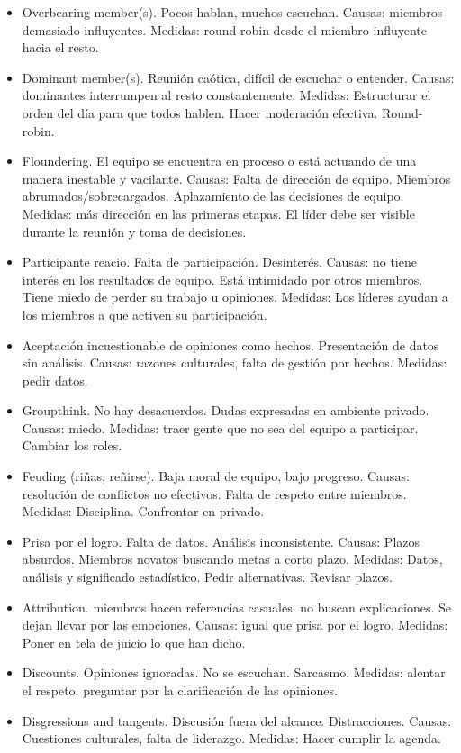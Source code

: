 \documentclass[]{article}
\begin{document}
\begin{itemize}
	\item Overbearing member(s). Pocos hablan, muchos escuchan. Causas: miembros demasiado influyentes. Medidas: round-robin desde el miembro influyente hacia el resto.
	\item Dominant member(s). Reunión caótica, difícil de escuchar o entender. Causas: dominantes interrumpen al resto constantemente. Medidas: Estructurar el orden del día para que todos hablen. Hacer moderación efectiva. Round-robin.
	\item Floundering. El equipo se encuentra en proceso o está actuando de una manera inestable y vacilante. Causas: Falta de dirección de equipo. Miembros abrumados/sobrecargados. Aplazamiento de las decisiones de equipo. Medidas: más dirección en las primeras etapas. El líder debe ser visible durante la reunión y toma de decisiones.
	\item Participante reacio. Falta de participación. Desinterés. Causas: no tiene interés en los resultados de equipo. Está intimidado por otros miembros. Tiene miedo de perder su trabajo u opiniones. Medidas: Los líderes ayudan a los miembros a que activen su participación.
	\item Aceptación incuestionable de opiniones como hechos. Presentación de datos sin análisis. Causas: razones culturales, falta de gestión por hechos. Medidas: pedir datos.
	\item Groupthink. No hay desacuerdos. Dudas expresadas en ambiente privado. Causas: miedo. Medidas: traer gente que no sea del equipo a participar. Cambiar los roles.
	\item Feuding (riñas, reñirse). Baja moral de equipo, bajo progreso. Causas: resolución de conflictos no efectivos. Falta de respeto entre miembros. Medidas: Disciplina. Confrontar en privado. 
	\item Prisa por el logro. Falta de datos. Análisis inconsistente. Causas: Plazos absurdos. Miembros novatos buscando metas a corto plazo. Medidas: Datos, análisis y significado estadístico. Pedir alternativas. Revisar plazos.
	\item Attribution. miembros hacen referencias casuales. no buscan explicaciones. Se dejan llevar por las emociones. Causas: igual que prisa por el logro. Medidas: Poner en tela de juicio lo que han dicho.
	\item Discounts. Opiniones ignoradas. No se escuchan. Sarcasmo. Medidas: alentar el respeto. preguntar por la clarificación de las opiniones.
	\item Disgressions and tangents. Discusión fuera del alcance. Distracciones. Causas: Cuestiones culturales, falta de liderazgo. Medidas: Hacer cumplir la agenda. 
\end{itemize}
\end{document}
